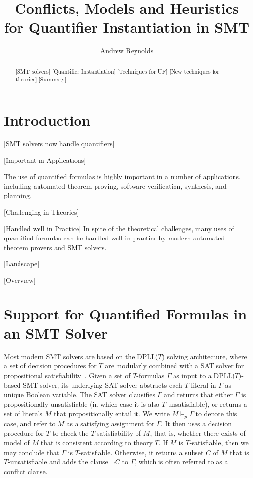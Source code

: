 \documentclass[oribibl]{llncs}
\begin{document}
\title{Conflicts, Models and Heuristics for Quantifier Instantiation in SMT}

\author {Andrew Reynolds}

\maketitle

\pagestyle{plain}

\begin{abstract}
[SMT solvers]
[Quantifier Instantiation]
[Techniques for UF]
[New techniques for theories]
[Summary]
\end{abstract}

\section{Introduction}

[SMT solvers now handle quantifiers]

[Important in Applications]

The use of quantified formulas is highly important in a number of applications,
including automated theorem proving, software verification, synthesis, and planning.

[Challenging in Theories]

[Handled well in Practice]
In spite of the theoretical challenges, many uses of quantified formulas
can be handled well in practice by modern automated theorem provers and SMT solvers.

[Landscape]

[Overview]

\section{Support for Quantified Formulas in an SMT Solver}

Most modern SMT solvers are based on the DPLL($T$) solving architecture,
where a set of decision procedures for $T$ are modularly combined with a SAT solver for propositional satisfiability~\cite{}.
Given a set of $T$-formulas $\Gamma$ as input to a DPLL($T$)-based SMT solver, its underlying SAT solver
abstracts each $T$-literal in $\Gamma$ as unique Boolean variable.
The SAT solver clausifies $\Gamma$ and returns that 
either $\Gamma$ is propositionally unsatisfiable (in which case it is also $T$-unsatisfiable),
or returns a set of literals $M$ that propositionally entail it.
We write $M \models_p \Gamma$ to denote this case, and refer to $M$ as a satisfying assignment for $\Gamma$.
It then uses a decision procedure for $T$ to
check the $T$-satisfiability of $M$, that is, whether there exists of model of $M$ that is consistent according to theory $T$.
If $M$ is $T$-satisfiable, then we may conclude that $\Gamma$ is $T$-satisfiable.
Otherwise, it returns a subset $C$ of $M$ that is $T$-unsatisfiable and adds the clause $\neg C$ to $\Gamma$,
which is often referred to as a conflict clause.
\end{document}
